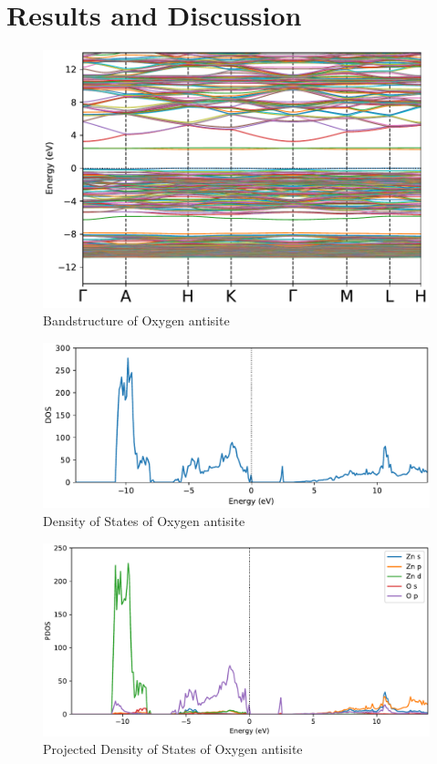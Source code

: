 \chapter{Results and Discussion}

\begin{figure}[tbh!]
	\centering
	\includegraphics[width=0.7\linewidth]{"images/bands_O-antisite"}
	\caption[Bandstructure of Oxygen antisite]{Bandstructure of Oxygen antisite}
\end{figure}

\begin{figure}[tbh!]
	\centering
	\includegraphics[width=0.7\linewidth]{"images/dos_O-antisite"}
	\caption[Density of states of Oxygen antisite]{Density of States of Oxygen antisite}
\end{figure}

\begin{figure}[tbh!]
	\centering
	\includegraphics[width=0.7\linewidth]{"images/pdos_O-antisite"}
	\caption[Projected Density of states of Oxygen antisite]{Projected Density of States of Oxygen antisite}
\end{figure}

